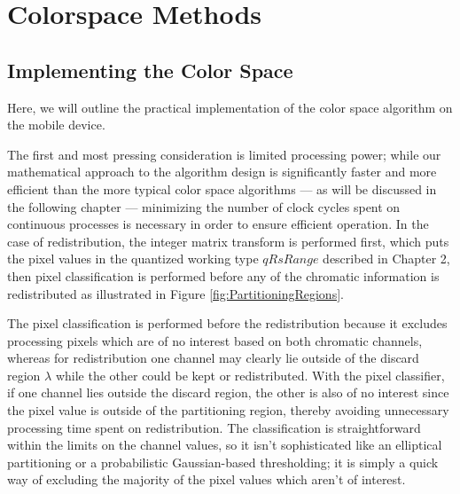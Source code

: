 
\chapter{Colorspace Methods}

\section{Implementing the Color Space}\label{sec:ImplementingTheColorSpace}

Here, we will outline the practical implementation of the color space algorithm on the mobile device.

The first and most pressing consideration is limited processing power; while our mathematical approach to the algorithm design is significantly faster and more efficient than the more typical color space algorithms --- as will be discussed in the following chapter --- minimizing the number of clock cycles spent on continuous processes is necessary in order to ensure efficient operation. In the case of redistribution, the integer matrix transform is performed first, which puts the pixel values in the quantized working type $qRsRange$ described in Chapter 2, then pixel classification is performed before any of the chromatic information is redistributed as illustrated in Figure \ref{fig:PartitioningRegions}.

The pixel classification is performed before the redistribution because it excludes processing pixels which are of no interest based on both chromatic channels, whereas for redistribution one channel may clearly lie outside of the discard region $\lambda$ while the other could be kept or redistributed. With the pixel classifier, if one channel lies outside the discard region, the other is also of no interest since the pixel value is outside of the partitioning region, thereby avoiding unnecessary processing time spent on redistribution. The classification is straightforward within the limits on the channel values, so it isn't sophisticated like an elliptical partitioning or a probabilistic Gaussian-based thresholding; it is simply a quick way of excluding the majority of the pixel values which aren't of interest.

